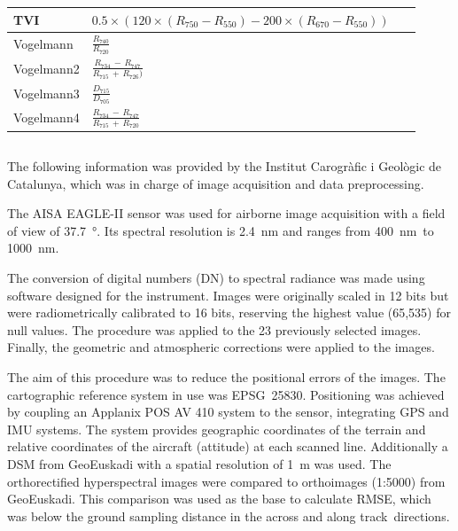 \documentclass[remotesensing,article,accept,moreauthors,pdftex]{Definitions/mdpi}
\begin{document}
\begin{paracol}{2}
\begin{specialtable}[H]
{\begin{tabular}{lll}
		\midrule
		TVI             & \parbox{3.8cm}{$0.5\times (120 \times (R_{750}-R_{550})-200 \times (R_{670}-R_{550}))$}              &~\cite{broge2001}              \\
		\midrule
		Vogelmann       & $\frac{R_{740}}{R_{720}}$                                                                            &~\cite{vogelmann1993}          \\
		Vogelmann2      & $\frac{R_{734}\,-\,R_{747}}{R_{715}\,+\,R_{726})}$                                                           &~\cite{vogelmann1993}          \\
		Vogelmann3      & $\frac{D_{715}}{D_{705}}$                                                                            &~\cite{vogelmann1993}          \\
		Vogelmann4      & $\frac{R_{734}\,-\,R_{747}}{R_{715}\,+\,R_{720}}$                                                            &~\cite{vogelmann1993}     \\
		\bottomrule
	\end{tabular}
	\label{tab:vegindices}}
	\end{specialtable}

\subsection{}

The following information was provided by the Institut Carogràfic i Geològic de Catalunya, which was in charge of image acquisition and data preprocessing.

The AISA EAGLE-II sensor was used for airborne image acquisition with a field of view of 37.7~°.
Its spectral resolution is 2.4~nm and ranges from 400~nm\ to 1000~nm.

The conversion of digital numbers (DN) to spectral radiance was made  using software designed for the instrument.
Images were originally scaled in 12 bits but were radiometrically calibrated to 16 bits, reserving the highest value (65,535) for null values.
The procedure was applied to the 23 previously selected images.
Finally, the geometric and atmospheric corrections were applied to the images.

The aim of this procedure was to reduce the positional errors of the images.
The cartographic reference system in use was EPSG~25830.
Positioning was achieved by coupling an Applanix POS AV 410 system to the sensor, integrating GPS and IMU systems.
The system provides geographic coordinates of the terrain and relative coordinates of the aircraft (attitude) at each scanned line.
Additionally a DSM from GeoEuskadi with a spatial resolution of 1~m was used.
The orthorectified hyperspectral images were compared to orthoimages (1:5000) from GeoEuskadi.
This comparison was used as the base to calculate RMSE, which was below the ground sampling distance in the across and along track~directions.


\end{paracol}
\end{document}

